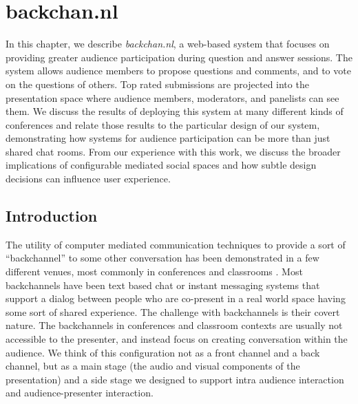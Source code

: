 \chapter{backchan.nl}
\label{ch:backchannl}

In this chapter, we describe \emph{backchan.nl}, a web-based system that focuses on providing greater audience participation during question and answer sessions. The system allows audience members to propose questions and comments, and to vote on the questions of others. Top rated submissions are projected into the presentation space where audience members, moderators, and panelists can see them. We discuss the results of deploying this system at many different kinds of conferences and relate those results to the particular design of our system, demonstrating how systems for audience participation can be more than just shared chat rooms. From our experience with this work, we discuss the broader implications of configurable mediated social spaces and how subtle design decisions can influence user experience. 

\section{Introduction}
The utility of computer mediated communication techniques to provide a sort of ``backchannel'' to some other conversation has been demonstrated in a few different venues, most commonly in conferences \citep{mccarthy_digital_2004, Rekimoto:1998jy} and classrooms \citep{Cogdill:2001fp, Yardi:2006uk}. Most backchannels have been text based chat or instant messaging systems that support a dialog between people who are co-present in a real world space having some sort of shared experience. The challenge with backchannels is their covert nature. The backchannels in conferences and classroom contexts are usually not accessible to the presenter, and instead focus on creating conversation within the audience. We think of this configuration not as a front channel and a back channel, but as a main stage (the audio and visual components of the presentation) and a side stage we designed to support intra audience interaction and audience-presenter interaction.

